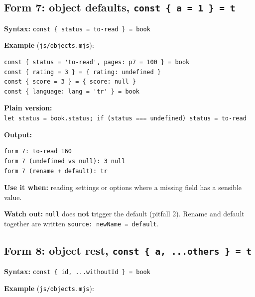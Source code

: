 \documentclass[
  10pt,
]{article}
\begin{document}
\hypertarget{form-7-object-defaults-const--a--1---t}{%
\subsection{\texorpdfstring{Form 7: object defaults,
\texttt{const\ \{\ a\ =\ 1\ \}\ =\ t}}{Form 7: object defaults, }}\label{form-7-object-defaults-const--a--1---t}}

\textbf{Syntax:}
\texttt{const\ \{\ status\ =\ \allowbreak{}\textquotesingle{}to-read\allowbreak{}\textquotesingle{}\ \}\ =\ book}

\textbf{Example} (\texttt{js/\allowbreak{}objects.\allowbreak{}mjs}):

\begin{verbatim}
const { status = 'to-read', pages: p7 = 100 } = book
const { rating = 3 } = { rating: undefined }
const { score = 3 } = { score: null }
const { language: lang = 'tr' } = book
\end{verbatim}

\textbf{Plain version:}
\texttt{let\ status\ =\ book.\allowbreak{}status;\ if\ (status\ ===\ undefined)\ status\ =\ \allowbreak{}\textquotesingle{}to-read\allowbreak{}\textquotesingle{}}

\textbf{Output:}

\begin{verbatim}
form 7: to-read 160
form 7 (undefined vs null): 3 null
form 7 (rename + default): tr
\end{verbatim}

\textbf{Use it when:} reading settings or options where a missing field
has a sensible value.

\textbf{Watch out:} \texttt{null} does \textbf{not} trigger the default
(pitfall 2). Rename and default together are written
\texttt{source:\ newName\ =\ default}.

\hypertarget{form-8-object-rest-const--a-others---t}{%
\subsection{\texorpdfstring{Form 8: object rest,
\texttt{const\ \{\ a,\ .\allowbreak{}.\allowbreak{}.\allowbreak{}others\ \}\ =\ t}}{Form 8: object rest, }}\label{form-8-object-rest-const--a-others---t}}

\textbf{Syntax:}
\texttt{const\ \{\ id,\ .\allowbreak{}.\allowbreak{}.\allowbreak{}withoutId\ \}\ =\ book}

\textbf{Example} (\texttt{js/\allowbreak{}objects.\allowbreak{}mjs}):
\end{document}
